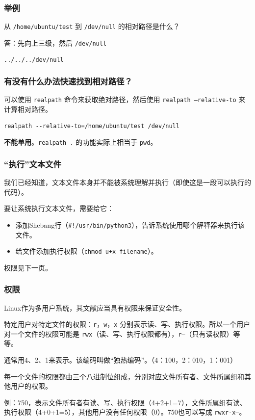 \documentclass{ctexbeamer}
\begin{document}
\begin{frame}[fragile]
    \frametitle{举例}

    从 \texttt{/home/ubuntu/test} 到 \texttt{/dev/null} 的相对路径是什么？

    答：先向上三级，然后 \texttt{/dev/null}
    \begin{verbatim}
../../../dev/null
    \end{verbatim}

\end{frame}

\begin{frame}[fragile]
    \frametitle{有没有什么办法快速找到相对路径？}

    可以使用 \texttt{realpath} 命令来获取绝对路径，然后使用 \texttt{realpath --relative-to} 来计算相对路径。

    \begin{verbatim}
realpath --relative-to=/home/ubuntu/test /dev/null
    \end{verbatim}

    \textbf{不能单用}。\texttt{realpath .} 的功能实际上相当于 \texttt{pwd}。

\end{frame}

\begin{frame}
    \frametitle{“执行”文本文件}

    我们已经知道，文本文件本身并不能被系统理解并执行（即使这是一段可以执行的代码）。

    要让系统执行文本文件，需要给它：
    \begin{itemize}
        \item 添加Shebang行（\texttt{\#!/usr/bin/python3}），告诉系统使用哪个解释器来执行该文件。
        \item 给文件添加执行权限（\texttt{chmod u+x filename}）。
    \end{itemize}

    权限见下一页。
\end{frame}

\begin{frame}
    \frametitle{权限}

    Linux作为多用户系统，其文献应当具有权限来保证安全性。

    特定用户对特定文件的权限：\texttt{r}，\texttt{w}，\texttt{x} 分别表示读、写、执行权限。所以一个用户对一个文件的权限可能是 \texttt{rwx}（读、写、执行权限都有），\texttt{r--}（只有读权限）等等。

    通常用4、2、1来表示。该编码叫做“独热编码”。（4：100，2：010，1：001）

    每一个文件的权限都由三个八进制位组成，分别对应文件所有者、文件所属组和其他用户的权限。

    例：750，表示文件所有者有读、写、执行权限（4+2+1=7），文件所属组有读、执行权限（4+0+1=5），其他用户没有任何权限（0）。750也可以写成 \texttt{rwxr-x---}。



\end{frame}
\end{document}

